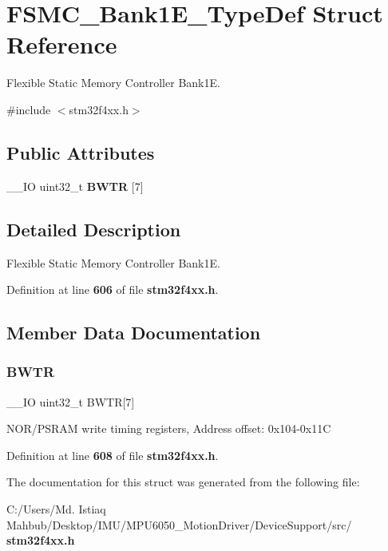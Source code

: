 \section{F\+S\+M\+C\+\_\+\+Bank1\+E\+\_\+\+Type\+Def Struct Reference}
\label{structFSMC__Bank1E__TypeDef}


Flexible Static Memory Controller Bank1E.  




{\ttfamily \#include $<$stm32f4xx.\+h$>$}

\subsection*{Public Attributes}
\begin{DoxyCompactItemize}
\item 
\+\_\+\+\_\+\+IO uint32\+\_\+t \textbf{ B\+W\+TR} [7]
\end{DoxyCompactItemize}


\subsection{Detailed Description}
Flexible Static Memory Controller Bank1E. 

Definition at line \textbf{ 606} of file \textbf{ stm32f4xx.\+h}.



\subsection{Member Data Documentation}
\mbox{\label{structFSMC__Bank1E__TypeDef_a20f13b79c0f8670af319af0c5ebd5c91}} 
\subsubsection{B\+W\+TR}
{\footnotesize\ttfamily \+\_\+\+\_\+\+IO uint32\+\_\+t B\+W\+TR[7]}

N\+O\+R/\+P\+S\+R\+AM write timing registers, Address offset\+: 0x104-\/0x11C 

Definition at line \textbf{ 608} of file \textbf{ stm32f4xx.\+h}.



The documentation for this struct was generated from the following file\+:\begin{DoxyCompactItemize}
\item 
C\+:/\+Users/\+Md. Istiaq Mahbub/\+Desktop/\+I\+M\+U/\+M\+P\+U6050\+\_\+\+Motion\+Driver/\+Device\+Support/src/\textbf{ stm32f4xx.\+h}\end{DoxyCompactItemize}
